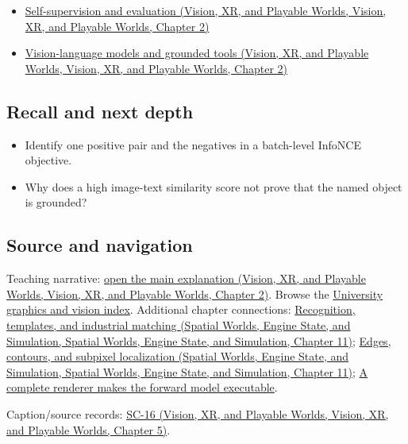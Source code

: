 \begin{itemize}
\tightlist
\item
  \href{../07-Vision-XR-and-Playable-Worlds/main.pdf\#nameddest=04-visual-computing-ii-ch031-self-supervision-and-evaluation}{Self-supervision and evaluation (Vision, XR, and Playable Worlds, Vision, XR, and Playable Worlds, Chapter 2)}
\item
  \href{../07-Vision-XR-and-Playable-Worlds/main.pdf\#nameddest=04-visual-computing-ii-ch031-vision-language-models-and-grounded-tools}{Vision-language models and grounded tools (Vision, XR, and Playable Worlds, Vision, XR, and Playable Worlds, Chapter 2)}
\end{itemize}

\subsection{Recall and next depth}\label{appendix-772f1fd96148-recall-and-next-depth}

\begin{itemize}
\tightlist
\item
  Identify one positive pair and the negatives in a batch-level InfoNCE objective.
\item
  Why does a high image-text similarity score not prove that the named object is grounded?
\end{itemize}

\subsection{Source and navigation}\label{appendix-772f1fd96148-source-and-navigation}

Teaching narrative: \href{../07-Vision-XR-and-Playable-Worlds/main.pdf\#nameddest=04-visual-computing-ii-ch031-self-supervision-and-evaluation}{open the main explanation (Vision, XR, and Playable Worlds, Vision, XR, and Playable Worlds, Chapter 2)}. Browse the \hyperref[appendix-a6d556a4ef50-university-graphics-vision-and-photography---independent-series]{University graphics and vision index}. Additional chapter connections: \href{../05-Spatial-Worlds-Engine-State-and-Simulation/main.pdf\#nameddest=04-visual-computing-ii-ch030-recognition-templates-and-industrial-matching}{Recognition, templates, and industrial matching (Spatial Worlds, Engine State, and Simulation, Spatial Worlds, Engine State, and Simulation, Chapter 11)}; \href{../05-Spatial-Worlds-Engine-State-and-Simulation/main.pdf\#nameddest=04-visual-computing-ii-ch030-edges-contours-and-subpixel-localization}{Edges, contours, and subpixel localization (Spatial Worlds, Engine State, and Simulation, Spatial Worlds, Engine State, and Simulation, Chapter 11)}; \hyperref[04-visual-computing-ii-ch035-a-complete-renderer-makes-the-forward-model-executable]{A complete renderer makes the forward model executable}.

Caption/source records: \href{../07-Vision-XR-and-Playable-Worlds/main.pdf\#nameddest=04-visual-computing-ii-ch036-sc-16---stanford-cs231n-deep-learning-for-computer-vision-spring-2025-lecture-16-vision-and-language}{SC-16 (Vision, XR, and Playable Worlds, Vision, XR, and Playable Worlds, Chapter 5)}.
